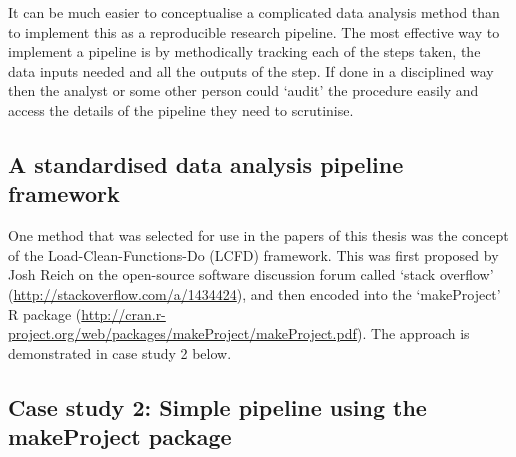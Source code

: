 \documentclass[11pt,a4paper]{article}
\begin{document}
It can be much easier to conceptualise a complicated data analysis
method than to implement this as a reproducible research pipeline. The
most effective way to implement a pipeline is by methodically tracking
each of the steps taken, the data inputs needed and all the outputs of
the step. If done in a disciplined way then the analyst or some other
person could `audit' the procedure easily and access the details of the
pipeline they need to scrutinise.

\subsection{A standardised data analysis pipeline
framework}\label{a-standardised-data-analysis-pipeline-framework}

One method that was selected for use in the papers of this thesis was
the concept of the Load-Clean-Functions-Do (LCFD) framework. This was
first proposed by Josh Reich on the open-source software discussion
forum called `stack overflow'
(\url{http://stackoverflow.com/a/1434424}), and then encoded into the
`makeProject' R package
(\url{http://cran.r-project.org/web/packages/makeProject/makeProject.pdf}).
The approach is demonstrated in case study 2 below.

\clearpage

\subsection{Case study 2: Simple pipeline using the makeProject
package}\label{case-study-2-simple-pipeline-using-the-makeproject-package}
\end{document}
